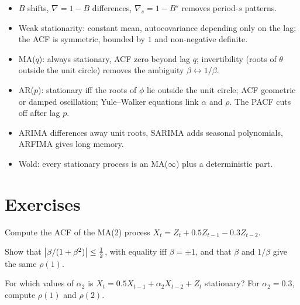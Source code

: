 \begin{notechapter}
\begin{chaptersummary}
\begin{itemize}[nosep]
  \item $B$ shifts, $\nabla = 1 - B$ differences, $\nabla_s = 1 - B^s$ removes period-$s$ patterns.
  \item Weak stationarity: constant mean, autocovariance depending only on the lag; the ACF
        is symmetric, bounded by $1$ and non-negative definite.
  \item MA($q$): always stationary, ACF zero beyond lag $q$; invertibility (roots of $\theta$ outside the
        unit circle) removes the ambiguity $\beta\leftrightarrow1/\beta$.
  \item AR($p$): stationary iff the roots of $\phi$ lie outside the unit circle; ACF geometric or damped
        oscillation; Yule--Walker equations link $\alpha$ and $\rho$. The PACF cuts off after lag $p$.
  \item ARIMA differences away unit roots, SARIMA adds seasonal polynomials, ARFIMA gives
        long memory.
  \item Wold: every stationary process is an MA($\infty$) plus a deterministic part.
\end{itemize}
\end{chaptersummary}

\section*{Exercises}

\begin{exercise}\label{linear-time-series:exr:1}
Compute the ACF of the MA(2) process $X_t = Z_t + 0.5Z_{t-1} - 0.3Z_{t-2}$.
\end{exercise}

\begin{exercise}\label{linear-time-series:exr:2}
Show that $\left|\beta/(1 + \beta^2)\right|\leq\frac12$, with equality iff $\beta = \pm1$, and that $\beta$ and $1/\beta$ give the same $\rho(1)$.
\end{exercise}

\begin{exercise}\label{linear-time-series:exr:3}
For which values of $\alpha_2$ is $X_t = 0.5X_{t-1} + \alpha_2X_{t-2} + Z_t$ stationary? For $\alpha_2 = 0.3$, compute $\rho(1)$
and $\rho(2)$.
\end{exercise}


\end{notechapter}

